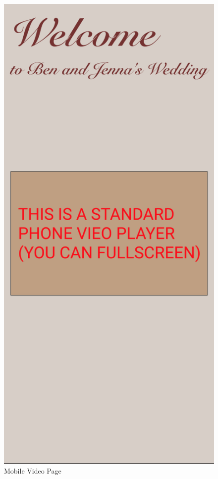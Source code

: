 \documentclass[onecolumn, draftclsnofoot,10pt, compsoc]{IEEEtran}
\begin{document}
\begin{figure}[H]
            \label{fig:MAdmin}
        \endminipage\hfill
            \includegraphics[scale=0.4]{Images/mobile-video.png}
            \centering\caption{Mobile Video Page}
            \label{fig:MVideo}
        \endminipage\hfill
         \end{figure}
\end{document}
